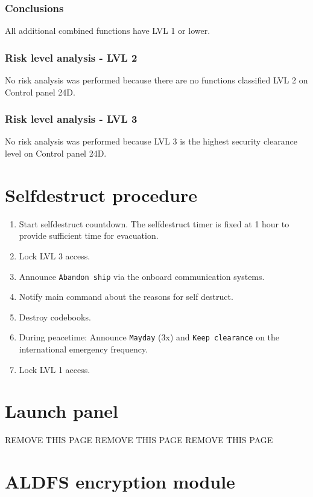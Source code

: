 \documentclass[a4paper]{article}
\newcommand{\cockpit}{Control panel 24D}
\newcommand{\fakepage}{REMOVE THIS PAGE\clearpage}
\begin{document}
\subsubsection{Conclusions}
All additional combined functions have LVL 1 or lower.


\subsubsection{Risk level analysis - LVL 2}
No risk analysis was performed because there are no functions classified LVL 2 on \cockpit.


\subsubsection{Risk level analysis - LVL 3}
No risk analysis was performed because LVL 3 is the highest security clearance level on \cockpit.


\clearpage
\section{Selfdestruct procedure}

\begin{enumerate}
	\item	Start selfdestruct countdown. The selfdestruct timer is fixed at 1 hour to provide sufficient time for evacuation.
	\item	Lock LVL 3 access.
	\item	Announce \texttt{Abandon ship} via the onboard communication systems.
	\item	Notify main command about the reasons for self destruct.
	\item	Destroy codebooks.
	\item	During peacetime: Announce \texttt{Mayday} (3x) and \texttt{Keep clearance} on the international emergency frequency.
	\item	Lock LVL 1 access.
\end{enumerate}

\clearpage
\section{Launch panel}

\fakepage
\fakepage
\fakepage

\section{ALDFS encryption module}

\end{document}
